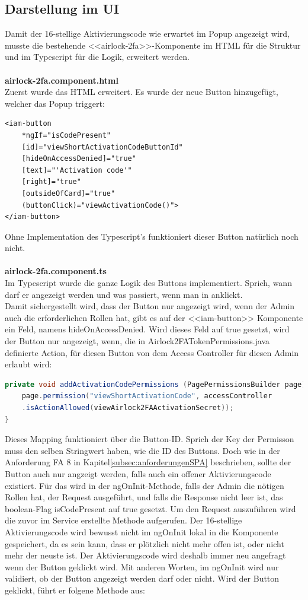 \subsection{Darstellung im UI}
Damit der 16-stellige Aktivierungscode wie erwartet im Popup angezeigt wird, musste die bestehende <<airlock-2fa>>-Komponente im HTML für die Struktur und im Typescript für die Logik, erweitert werden.
\\
\\
\textbf{airlock-2fa.component.html}
\\
Zuerst wurde das HTML erweitert. Es wurde der neue Button hinzugefügt, welcher das Popup triggert:
\begin{lstlisting}
<iam-button
	*ngIf="isCodePresent"
	[id]="viewShortActivationCodeButtonId"
	[hideOnAccessDenied]="true"
	[text]="'Activation code'"
	[right]="true"
	[outsideOfCard]="true"
	(buttonClick)="viewActivationCode()">
</iam-button>
\end{lstlisting}
Ohne Implementation des Typescript's funktioniert dieser Button natürlich noch nicht.\\
\\
\textbf{airlock-2fa.component.ts}
\\
Im Typescript wurde die ganze Logik des Buttons implementiert. Sprich, wann darf er angezeigt werden und was passiert, wenn man in anklickt. \\
Damit sichergestellt wird, dass der Button nur angezeigt wird, wenn der Admin auch die erforderlichen Rollen hat, gibt es auf der <<iam-button>> Komponente ein Feld, namens \flqq hideOnAccessDenied\frqq{}. Wird dieses Feld auf true gesetzt, wird der Button nur angezeigt, wenn, die in Airlock2FATokenPermissions.java definierte Action, für diesen Button von dem Access Controller für diesen Admin erlaubt wird:
\begin{lstlisting}[language=Java]
private void addActivationCodePermissions (PagePermissionsBuilder page) {
	page.permission("viewShortActivationCode", accessController
	.isActionAllowed(viewAirlock2FAActivationSecret));
}
\end{lstlisting}
Dieses Mapping funktioniert über die Button-ID. Sprich der Key der Permisson muss den selben Stringwert haben, wie die ID des Buttons. Doch wie in der Anforderung \flqq FA 8\frqq{} in Kapitel\ref{subsec:anforderungenSPA} beschrieben, sollte der Button auch nur angzeigt werden, falls auch ein offener Aktivierungscode existiert. Für das wird in der ngOnInit-Methode, falls der Admin die nötigen Rollen hat, der Request ausgeführt, und falls die Response nicht leer ist, das boolean-Flag \flqq isCodePresent auf true gesetzt. Um den Request auszuführen wird die zuvor im Service erstellte Methode aufgerufen. Der 16-stellige Aktivierungscode wird bewusst nicht im ngOnInit lokal in die Komponente gespeichert, da es sein kann, dass er plötzlich nicht mehr offen ist, oder nicht mehr der neuste ist. Der Aktivierungscode wird deshalb immer neu angefragt wenn der Button geklickt wird. Mit anderen Worten, im ngOnInit wird nur validiert, ob der Button angezeigt werden darf oder nicht. Wird der Button geklickt, führt er folgene Methode aus:
